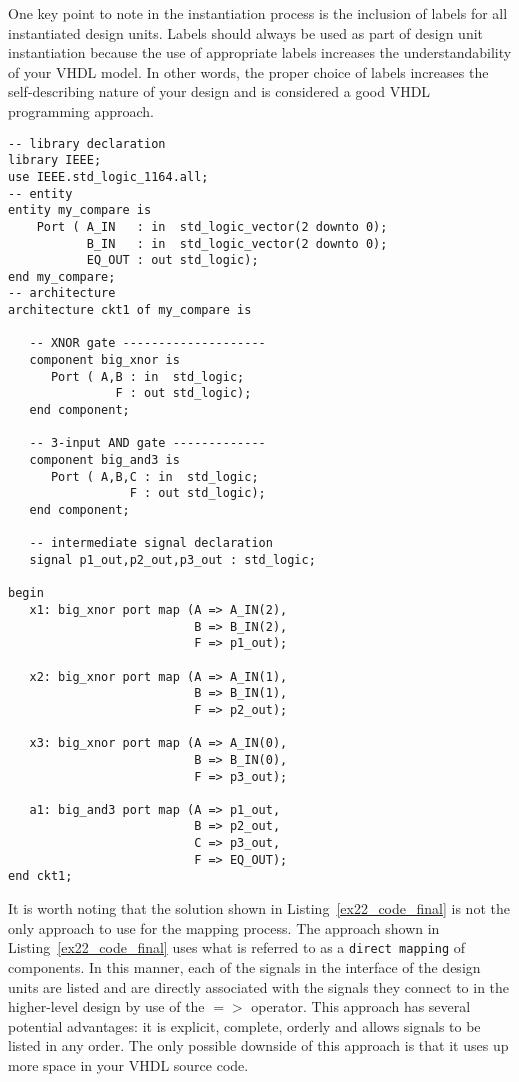 One key point to note in the instantiation process is the inclusion of labels for all instantiated design units. Labels should always be used as part of design unit instantiation because the use of appropriate labels increases the understandability of your VHDL model. In other words, the proper choice of labels increases the self-describing nature of your design and is considered a good VHDL programming approach.

\noindent
\begin{minipage}{0.99\linewidth}
\begin{lstlisting}[label=ex22_code_final, caption=VHDL code for the design hierarchy for the 3-bit comparator.]
-- library declaration
library IEEE;
use IEEE.std_logic_1164.all;
-- entity
entity my_compare is
    Port ( A_IN   : in  std_logic_vector(2 downto 0);
           B_IN   : in  std_logic_vector(2 downto 0);
           EQ_OUT : out std_logic);
end my_compare;
-- architecture
architecture ckt1 of my_compare is

   -- XNOR gate --------------------
   component big_xnor is
      Port ( A,B : in  std_logic;
               F : out std_logic);
   end component;

   -- 3-input AND gate -------------
   component big_and3 is
      Port ( A,B,C : in  std_logic;
                 F : out std_logic);
   end component;

   -- intermediate signal declaration
   signal p1_out,p2_out,p3_out : std_logic;

begin
   x1: big_xnor port map (A => A_IN(2),
                          B => B_IN(2),
                          F => p1_out);

   x2: big_xnor port map (A => A_IN(1),
                          B => B_IN(1),
                          F => p2_out);

   x3: big_xnor port map (A => A_IN(0),
                          B => B_IN(0),
                          F => p3_out);

   a1: big_and3 port map (A => p1_out,
                          B => p2_out,
                          C => p3_out,
                          F => EQ_OUT);
end ckt1;
\end{lstlisting}
\end{minipage}

It is worth noting that the solution shown in Listing~\ref{ex22_code_final} is not the only approach to use for the mapping process. The approach shown in Listing~\ref{ex22_code_final} uses what is referred to as a \texttt{direct mapping} of components. In this manner, each of the signals in the interface of the design units are listed and are directly associated with the signals they connect to in the higher-level design by use of the $=>$ operator. This approach has several potential advantages: it is explicit, complete, orderly and allows signals to be listed in any order. The only possible downside of this approach is that it uses up more space in your VHDL source code.

